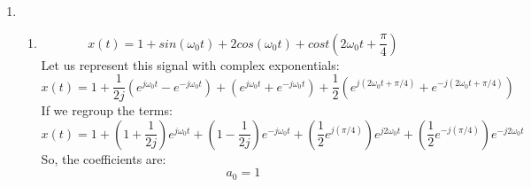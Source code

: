 \documentclass[10pt,a4paper, margin=1in]{article}
\begin{document}
\begin{enumerate}
\item %
    \begin{enumerate}   
    \item %
    \begin{equation*}
        x(t) = 1 + sin(\omega_0t) + 2cos(\omega_0t) + cost(2\omega_0t + \frac{\pi}{4})
    \end{equation*}
    Let us represent this signal with complex exponentials:
    \begin{equation*}
        x(t) = 1 + \frac{1}{2j}(e^{j\omega_0t} - e^{-j\omega_0t}) + (e^{j\omega_0t} + e^{-j\omega_0t}) + \frac{1}{2} (e^{j(2\omega_0t + \pi/4)} + e^{-j(2\omega_0t + \pi/4)})
    \end{equation*}
    If we regroup the terms:
    \begin{equation*}
        x(t) = 1 + (1 + \frac{1}{2j})e^{j\omega_0t} + (1 - \frac{1}{2j})e^{-j\omega_0t} + (\frac{1}{2}e^{j(\pi/4)})e^{j2\omega_0t} + (\frac{1}{2}e^{-j(\pi/4)})e^{-j2\omega_0t}
    \end{equation*}
    So, the coefficients are:
    \begin{equation*}
        a_0 = 1
    \end{equation*}


\end{enumerate}
\end{enumerate}
\end{document}
